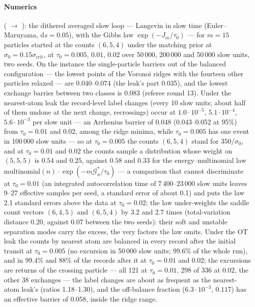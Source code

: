 \paragraph{Numerics} ( $\to$ ): the dithered averaged slow
loop --- Langevin in slow time (Euler--Maruyama, $\mathrm{d}s = 0.05$), with the Gibbs law $\exp(-J_m/\tau_0)$ ---
for $m = 15$ particles started at the counts $(6,5,4)$ under the matching prior at
$\sigma_0 = 0.15\sigma_{\mathrm{crit}}$, at $\tau_0 = 0.005$, $0.01$, $0.02$ over 50\,000, 200\,000 and 50\,000 slow
units, two seeds. On the instance the single-particle barriers out of the balanced configuration --- the lowest points
of the Voronoi ridges with the fourteen other particles relaxed --- are 0.040--0.074 (the leak's part 0.035), and the
lowest exchange barrier between two classes is 0.083 (referee round 13). Under the nearest-atom leak the record-level
label changes (every 10 slow units; about half of them undone at the next change, recrossings) occur at
$1.0\cdot10^{-5}$, $5.1\cdot10^{-4}$, $5.6\cdot10^{-3}$ per slow unit --- an Arrhenius barrier of 0.048 (0.043--0.052
at 95\%) from $\tau_0 = 0.01$ and $0.02$, among the ridge minima, while $\tau_0 = 0.005$ has one event in 100\,000 slow
units --- so at $\tau_0 = 0.005$ the counts $(6,5,4)$ stand for $350/\sigma_0$, and at $\tau_0 = 0.01$ and $0.02$ the
counts sample a distribution whose weight on $(5,5,5)$ is $0.54$ and $0.25$, against $0.58$ and $0.33$ for the
energy--multinomial law $\mathrm{multinomial}(n)\cdot\exp(-m\mathcal{G}^*_n/\tau_0)$ --- a comparison that cannot
discriminate at $\tau_0 = 0.01$ (an integrated autocorrelation time of 7\,400--23\,000 slow units leaves 9--27
effective samples per seed, a standard error of about 0.1) and puts the law 2.1 standard errors above the data at
$\tau_0 = 0.02$; the law under-weights the saddle count vectors $(6,4,5)$ and $(6,5,4)$ by 3.2 and 2.7 times
(total-variation distance 0.20, against 0.07 between the two seeds): their soft and unstable separation modes carry
the excess, the very factors the law omits. Under the OT leak the counts by nearest atom are balanced in every record
after the initial transit at $\tau_0 = 0.005$ (no excursion in 50\,000 slow units; 99.6\% of the whole run), and in
99.4\% and 88\% of the records after it at $\tau_0 = 0.01$ and $0.02$; the excursions are returns of the crossing
particle --- all 121 at $\tau_0 = 0.01$, 298 of 336 at $0.02$, the other 38 exchanges --- the label changes are about
as frequent as the nearest-atom leak's (ratios 1.18--1.30), and the off-balance fraction ($6.3\cdot10^{-3}$, $0.117$)
has an effective barrier of 0.058, inside the ridge range.

